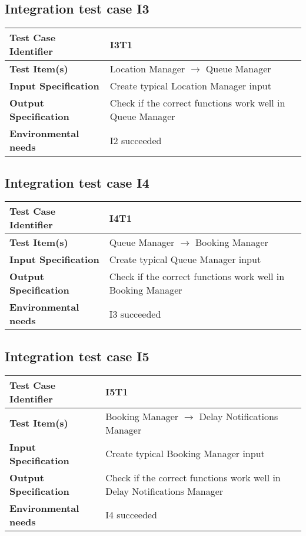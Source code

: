 \subsection{Integration test case I3}
\begin{tabular} {l p{9cm}}
	\hline \textbf{Test Case Identifier} & I3T1 \\
	\hline \textbf{Test Item(s)} & Location Manager $\rightarrow$ Queue Manager \\
	\hline \textbf{Input Specification} & Create typical Location Manager input \\
	\hline \textbf{Output Specification} & Check if the correct functions work well in Queue Manager \\
	\hline \textbf{Environmental needs} & I2 succeeded \\
	\hline 
\end{tabular}
\vspace{0.5cm}
\subsection{Integration test case I4}
\begin{tabular} {l p{9cm}}
	\hline \textbf{Test Case Identifier} & I4T1 \\
	\hline \textbf{Test Item(s)} & Queue Manager $\rightarrow$ Booking Manager \\
	\hline \textbf{Input Specification} & Create typical Queue Manager input \\
	\hline \textbf{Output Specification} & Check if the correct functions work well in Booking Manager \\
	\hline \textbf{Environmental needs} & I3 succeeded \\
	\hline 
\end{tabular}
\vspace{0.5cm}
\subsection{Integration test case I5}
\begin{tabular} {l p{9cm}}
	\hline \textbf{Test Case Identifier} & I5T1 \\
	\hline \textbf{Test Item(s)} & Booking Manager $\rightarrow$ Delay Notifications Manager \\
	\hline \textbf{Input Specification} & Create typical Booking Manager input \\
	\hline \textbf{Output Specification} & Check if the correct functions work well in Delay Notifications Manager \\
	\hline \textbf{Environmental needs} & I4 succeeded \\
	\hline 
\end{tabular}
\vspace{0.5cm}
